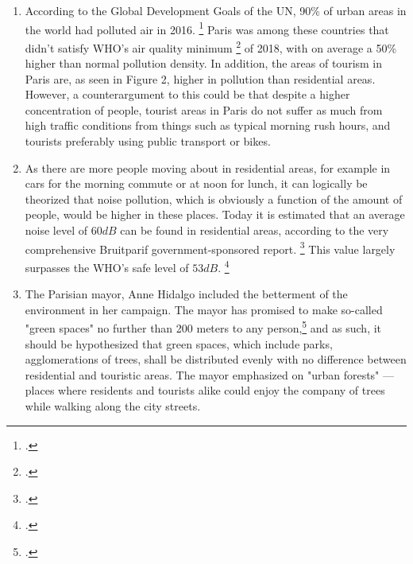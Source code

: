 \documentclass[11pt,letterpaper]{article}
\begin{document}
\begin{enumerate}
    \item According to the Global Development Goals of the UN, 90\% of urban areas in the world had polluted air in 2016. \footcite{sdg_report_2020} Paris was among these countries that didn't satisfy WHO's air quality minimum \footcite{ambient_outdoor_air_pollution_2018} of 2018, with on average a 50\% higher than normal pollution density. In addition, the areas of tourism in Paris are, as seen in Figure 2, higher in pollution than residential areas. However, a counterargument to this could be that despite a higher concentration of people, tourist areas in Paris do not suffer as much from high traffic conditions from things such as typical morning rush hours, and tourists preferably using public transport or bikes.

    \item As there are more people moving about in residential areas, for example in cars for the morning commute or at noon for lunch, it can logically be theorized that noise pollution, which is obviously a function of the amount of people, would be higher in these places. Today it is estimated that an average noise level of $60dB$ can be found in residential areas, according to the very comprehensive Bruitparif government-sponsored report. \footcite{bruitparif} This value largely surpasses the WHO's safe level of $53dB$. \footcite{who_noise_guidelines}

    \item The Parisian mayor, Anne Hidalgo included the betterment of the environment in her campaign. The mayor has promised to make so-called "green spaces" no further than 200 meters to any person,\footcite{anne_hidalgo_2020} and as such, it should be hypothesized that green spaces, which include parks, agglomerations of trees, shall be distributed evenly with no difference between residential and touristic areas. The mayor emphasized on "urban forests" --- places where residents and tourists alike could enjoy the company of trees while walking along the city streets.
\end{enumerate}
\end{document}
